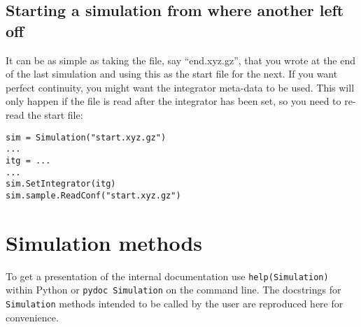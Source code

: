 \documentclass[a4paper]{article}
\begin{document}
\subsection{Starting a simulation from where another left off}

It can be as simple
as taking the file, say ``end.xyz.gz'', that you wrote at the end of the last
simulation and using this as the start file for the next. If you want perfect
continuity, you might want the integrator meta-data to be used. This will only
happen if the file is read after the integrator has been set, so you need to 
re-read the start file:

\begin{verbatim}
sim = Simulation("start.xyz.gz")
...
itg = ...
...
sim.SetIntegrator(itg)
sim.sample.ReadConf("start.xyz.gz") 
\end{verbatim}




\section{Simulation methods}


To get a presentation of the internal documentation use
\verb|help(Simulation)| within Python or \verb|pydoc Simulation| on the
command line. The docstrings for \verb|Simulation| methods intended
to be called by the user are reproduced here for convenience.
\end{document}
